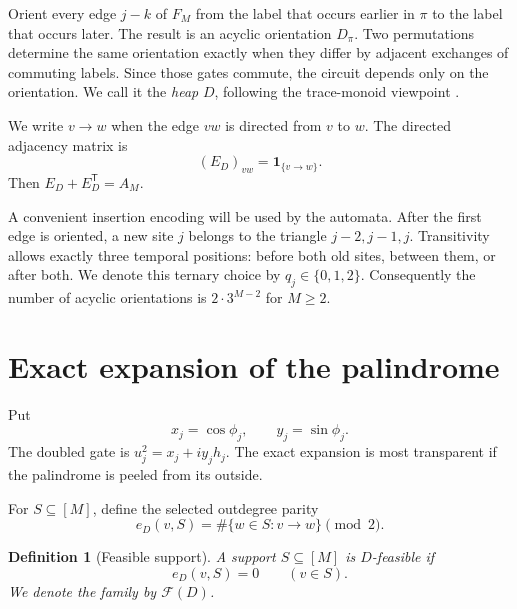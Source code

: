 \documentclass[10pt,letterpaper]{article}
\newtheorem{definition}[theorem]{Definition}
\newcommand{\Ffam}{\mathcal F}
\begin{document}
Orient every edge \(j-k\) of \(F_M\) from the label that occurs earlier in \(\pi\) to the label that occurs later.  The result is an acyclic orientation \(D_\pi\).  Two permutations determine the same orientation exactly when they differ by adjacent exchanges of commuting labels.  Since those gates commute, the circuit depends only on the orientation.  We call it the \emph{heap} \(D\), following the trace-monoid viewpoint \citep{CartierFoata1969}.

We write \(v\to w\) when the edge \(vw\) is directed from \(v\) to \(w\).  The directed adjacency matrix is
\begin{equation}\label{eq:directed-adj}
 (E_D)_{vw}=\mathbf1_{\{v\to w\}}.
\end{equation}
Then \(E_D+E_D^{\mathsf T}=A_M\).

A convenient insertion encoding will be used by the automata.  After the first edge is oriented, a new site \(j\) belongs to the triangle \(j-2,j-1,j\).  Transitivity allows exactly three temporal positions: before both old sites, between them, or after both.  We denote this ternary choice by \(q_j\in\{0,1,2\}\).  Consequently the number of acyclic orientations is \(2\cdot3^{M-2}\) for \(M\ge2\).

\section{Exact expansion of the palindrome}\label{sec:expansion}

Put
\begin{equation}\label{eq:xy}
 x_j=\cos\phi_j,
 \qquad
 y_j=\sin\phi_j.
\end{equation}
The doubled gate is \(u_j^2=x_j+i y_jh_j\).  The exact expansion is most transparent if the palindrome is peeled from its outside.

For \(S\subseteq[M]\), define the selected outdegree parity
\begin{equation}\label{eq:out-parity}
 e_D(v,S)=\#\{w\in S:v\to w\}\pmod2.
\end{equation}

\begin{definition}[Feasible support]\label{def:feasible}
A support \(S\subseteq[M]\) is \(D\)-feasible if
\begin{equation}\label{eq:feasible}
 e_D(v,S)=0 \qquad (v\in S).
\end{equation}
We denote the family by \(\Ffam(D)\).
\end{definition}
\end{document}
